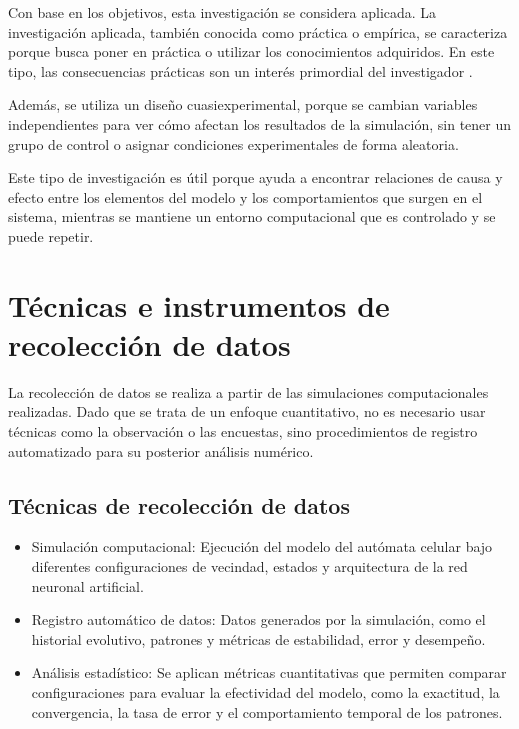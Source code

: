 Con base en los objetivos, esta investigación se considera aplicada. La investigación aplicada, también conocida como práctica o empírica, se caracteriza porque busca poner en práctica o utilizar los conocimientos adquiridos. En este tipo, las consecuencias prácticas son un interés primordial del investigador \cite{veracruz_aplicada}.

Además, se utiliza un diseño cuasiexperimental, porque se cambian variables independientes para ver cómo afectan los resultados de la simulación, sin tener un grupo de control o asignar condiciones experimentales de forma aleatoria. 

Este tipo de investigación es útil porque ayuda a encontrar relaciones de causa y efecto entre los elementos del modelo y los comportamientos que surgen en el sistema, mientras se mantiene un entorno computacional que es controlado y se puede repetir.

\section{Técnicas e instrumentos de recolección de datos}

La recolección de datos se realiza a partir de las simulaciones computacionales realizadas. Dado que se trata de un enfoque cuantitativo, no es necesario usar técnicas como la observación o las encuestas, sino procedimientos de registro automatizado para su posterior análisis numérico. 

\subsection{Técnicas de recolección de datos}

\begin{itemize}
	
	\item Simulación computacional: Ejecución del modelo del autómata celular bajo diferentes configuraciones de vecindad, estados y arquitectura de la red neuronal artificial.
	
	\item Registro automático de datos: Datos generados por la simulación, como el historial evolutivo, patrones y métricas de estabilidad, error y desempeño.
	
	\item Análisis estadístico: Se aplican métricas cuantitativas que permiten comparar configuraciones para evaluar la efectividad del modelo, como la exactitud, la convergencia, la tasa de error y el comportamiento temporal de los patrones.
	
\end{itemize}

